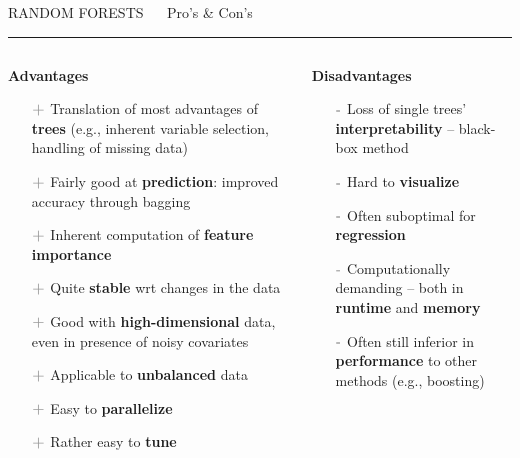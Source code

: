 \documentclass[11pt,compress,t,notes=noshow, xcolor=table]{beamer}
\begin{document}
\LARGE
\begin{frame}{\textcolor{gray!80}{RANDOM FORESTS} ~~ Pro's \& Con's}
\normalsize
\vspace{-0.5cm}
\noindent \textcolor{gray!80}{\rule{\textwidth}{1pt}}

\vspace{0.3cm}

\begin{columns}[onlytextwidth]
  \begin{column}{0.5\textwidth}
    \textbf{\textcolor{gray!80}{Advantages}}
    \footnotesize
    \begin{itemize}
      \item[$\textbf{\textcolor{gray!80}{+}}$] Translation of most advantages 
      of \textbf{trees} (e.g., inherent variable selection, handling of
      missing data)
      \item[$\textbf{\textcolor{gray!80}{+}}$] Fairly good at 
      \textbf{prediction}: improved accuracy through bagging
      \item[$\textbf{\textcolor{gray!80}{+}}$] Inherent computation of 
      \textbf{feature importance}
      \item[$\textbf{\textcolor{gray!80}{+}}$] Quite \textbf{stable} wrt changes 
      in the data
      \item[$\textbf{\textcolor{gray!80}{+}}$] Good with 
      \textbf{high-dimensional} data, even in presence of noisy covariates
      \item[$\textbf{\textcolor{gray!80}{+}}$] Applicable to \textbf{unbalanced} 
      data
      \item[$\textbf{\textcolor{gray!80}{+}}$] Easy to \textbf{parallelize}
      \item[$\textbf{\textcolor{gray!80}{+}}$] Rather easy to \textbf{tune}
    \end{itemize}
  \end{column}
  \begin{column}{0.5\textwidth}
    \textbf{\textcolor{gray!80}{Disadvantages}}
    \footnotesize
    \begin{itemize}
      \item[$\textbf{\textcolor{gray!80}{-}}$] Loss of single trees' 
      \textbf{interpretability} -- black-box method
      \item[$\textbf{\textcolor{gray!80}{-}}$] Hard to \textbf{visualize}
      \item[$\textbf{\textcolor{gray!80}{-}}$] Often suboptimal for 
      \textbf{regression}
      \item[$\textbf{\textcolor{gray!80}{-}}$] Computationally demanding --
      both in \textbf{runtime} and \textbf{memory}
      \item[$\textbf{\textcolor{gray!80}{-}}$] Often still inferior in
      \textbf{performance} to other methods (e.g., boosting)
    \end{itemize}
  \end{column}
\end{columns}


\end{frame}
\end{document}
